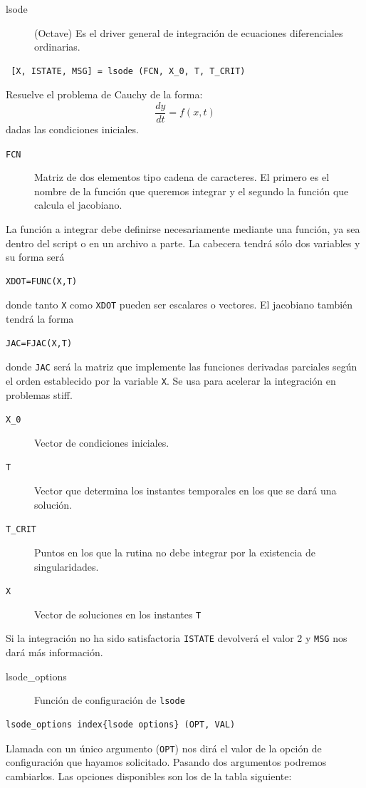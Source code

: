 \begin{description}
\item [lsode](Octave) Es el driver general de integración
  de ecuaciones diferenciales ordinarias.
\end{description}
\begin{verbatim} [X, ISTATE, MSG] = lsode (FCN, X_0, T, T_CRIT)
\end{verbatim}
Resuelve el problema de Cauchy de la forma:
$$ \frac{dy}{dt}=f(x,t)$$
dadas las condiciones iniciales.

\begin{description}
\item [\texttt{FCN}]Matriz de dos elementos tipo cadena de caracteres.
  El primero es el nombre de la función que queremos integrar y el
  segundo la función que calcula el jacobiano.
\end{description}
La función a integrar debe definirse necesariamente mediante una
función, ya sea dentro del script o en un archivo a parte. La cabecera
tendrá sólo dos variables y su forma será

\begin{verbatim}
XDOT=FUNC(X,T)
\end{verbatim}
donde tanto \texttt{X} como \texttt{XDOT} pueden ser escalares o
vectores.  El jacobiano también tendrá la forma
\begin{verbatim}
JAC=FJAC(X,T)
\end{verbatim}
donde \texttt{JAC} será la matriz que implemente las funciones
derivadas parciales según el orden establecido por la variable
\texttt{X}. Se usa para acelerar la integración en problemas stiff.

\begin{description}
\item [\texttt{X\_0}]Vector de condiciones iniciales.
\item [\texttt{T}]Vector que determina los instantes temporales en los
  que se dará una solución.
\item [\texttt{T\_CRIT}]Puntos en los que la rutina no debe integrar
  por la existencia de singularidades.
\item [\texttt{X}]Vector de soluciones en los instantes \texttt{T}
\end{description}
Si la integración no ha sido satisfactoria \texttt{ISTATE} devolverá
el valor 2 y \texttt{MSG} nos dará más información.

\begin{description}
\item [lsode\_options]Función de configuración de \texttt{lsode}
\end{description}
\begin{verbatim}
lsode_options index{lsode options} (OPT, VAL)
\end{verbatim}
Llamada con un único argumento (\texttt{OPT}) nos dirá el valor de la
opción de configuración que hayamos solicitado. Pasando dos argumentos
podremos cambiarlos. Las opciones disponibles son los de la tabla
siguiente:

